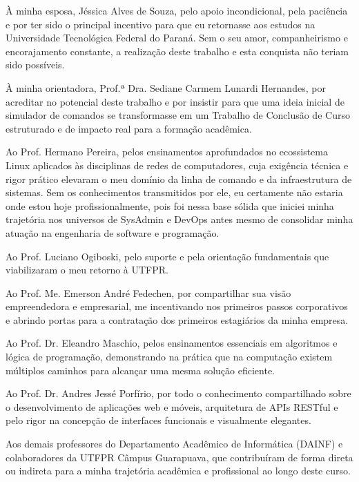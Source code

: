 \begin{agradecimentos}
À minha esposa, Jéssica Alves de Souza, pelo apoio incondicional, pela paciência e por ter sido o principal incentivo para que eu retornasse aos estudos na Universidade Tecnológica Federal do Paraná. Sem o seu amor, companheirismo e encorajamento constante, a realização deste trabalho e esta conquista não teriam sido possíveis.

À minha orientadora, Prof.ª Dra. Sediane Carmem Lunardi Hernandes, por acreditar no potencial deste trabalho e por insistir para que uma ideia inicial de simulador de comandos se transformasse em um Trabalho de Conclusão de Curso estruturado e de impacto real para a formação acadêmica.

Ao Prof. Hermano Pereira, pelos ensinamentos aprofundados no ecossistema Linux aplicados às disciplinas de redes de computadores, cuja exigência técnica e rigor prático elevaram o meu domínio da linha de comando e da infraestrutura de sistemas. Sem os conhecimentos transmitidos por ele, eu certamente não estaria onde estou hoje profissionalmente, pois foi nessa base sólida que iniciei minha trajetória nos universos de SysAdmin e DevOps antes mesmo de consolidar minha atuação na engenharia de software e programação.

Ao Prof. Luciano Ogiboski, pelo suporte e pela orientação fundamentais que viabilizaram o meu retorno à UTFPR.

Ao Prof. Me. Emerson André Fedechen, por compartilhar sua visão empreendedora e empresarial, me incentivando nos primeiros passos corporativos e abrindo portas para a contratação dos primeiros estagiários da minha empresa.

Ao Prof. Dr. Eleandro Maschio, pelos ensinamentos essenciais em algoritmos e lógica de programação, demonstrando na prática que na computação existem múltiplos caminhos para alcançar uma mesma solução eficiente.

Ao Prof. Dr. Andres Jessé Porfírio, por todo o conhecimento compartilhado sobre o desenvolvimento de aplicações web e móveis, arquitetura de APIs RESTful e pelo rigor na concepção de interfaces funcionais e visualmente elegantes.

Aos demais professores do Departamento Acadêmico de Informática (DAINF) e colaboradores da UTFPR Câmpus Guarapuava, que contribuíram de forma direta ou indireta para a minha trajetória acadêmica e profissional ao longo deste curso.
\end{agradecimentos}
